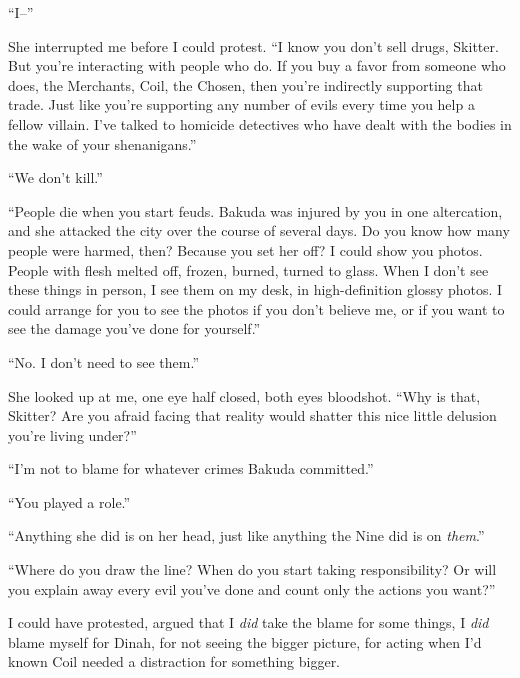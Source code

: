 ``I--''



She interrupted me before I could protest.  ``I know you don't sell drugs, Skitter.  But you're interacting with people who do.  If you buy a favor from someone who does, the Merchants, Coil, the Chosen, then you're indirectly supporting that trade.  Just like you're supporting any number of evils every time you help a fellow villain.  I've talked to homicide detectives who have dealt with the bodies in the wake of your shenanigans.''



``We don't kill.''



``People die when you start feuds.  Bakuda was injured by you in one altercation, and she attacked the city over the course of several days.  Do you know how many people were harmed, then?  Because you set her off?  I could show you photos.  People with flesh melted off, frozen, burned, turned to glass.  When I don't see these things in person, I see them on my desk, in high-definition glossy photos.  I could arrange for you to see the photos if you don't believe me, or if you want to see the damage you've done for yourself.''



``No.  I don't need to see them.''



She looked up at me, one eye half closed, both eyes bloodshot.  ``Why is that, Skitter?  Are you afraid facing that reality would shatter this nice little delusion you're living under?''



``I'm not to blame for whatever crimes Bakuda committed.''



``You played a role.''



``Anything she did is on her head, just like anything the Nine did is on \emph{them}.''



``Where do you draw the line?  When do you start taking responsibility?  Or will you explain away every evil you've done and count only the actions you want?''



I could have protested, argued that I \emph{did} take the blame for some things, I \emph{did} blame myself for Dinah, for not seeing the bigger picture, for acting when I'd known Coil needed a distraction for something bigger.



